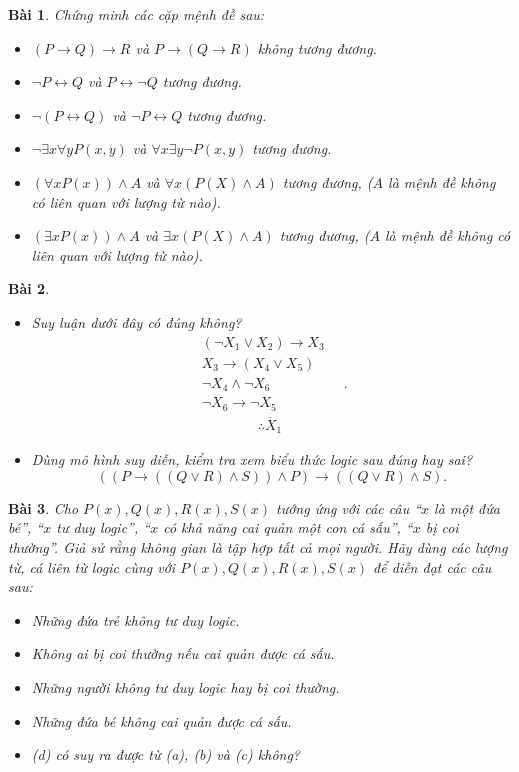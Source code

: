\documentclass[11pt, oneside,openright,a4paper]{book}
\newtheorem{bt}{Bài }[section]
\begin{document}
\begin{bt}
Chứng minh các cặp mệnh đề sau:
\begin{itemize}
\item[a)] $(P \rightarrow Q) \rightarrow R$ và $P \rightarrow (Q \rightarrow R)$ không tương đương.
    \item[b)] $\lnot P \leftrightarrow Q$ và $ P \leftrightarrow \lnot Q$ tương đương.
    \item[c)] $\lnot (P \leftrightarrow Q)$ và $ \lnot P \leftrightarrow Q$ tương đương.
    \item[d)] $\lnot \exists x \forall y P(x,y)$ và $\forall x \exists y \lnot P(x,y)$ tương đương.
    \item[e)] $(\forall x P(x)) \land A$ và $\forall x (P(X) \land A)$ tương đương, ($A$ là mệnh đề không có liên quan với lượng từ nào).
    \item[f)] $(\exists x P(x)) \land A$ và $\exists x (P(X) \land A)$ tương đương, ($A$ là mệnh đề không có liên quan với lượng từ nào).
\end{itemize}

\end{bt}
\begin{bt}
\begin{itemize}
\item[a)] Suy luận dưới đây có đúng không?
    $$\begin{matrix}
        (\lnot X_1 \lor X_2) \rightarrow X_3\\
        X_3 \rightarrow (X_4 \lor X_5)\\
        \lnot X_4 \land \lnot X_6\\
        \lnot X_6 \rightarrow \lnot X_5\\
        \overline{\qquad \qquad \therefore X_1 \qquad \qquad}
    \end{matrix}.$$
    \item[b)] Dùng mô hình suy diễn, kiểm tra xem biểu thức logic sau đúng hay sai?
    $$((P \rightarrow ((Q \lor R) \land S)) \land P) \rightarrow ((Q \lor R) \land S).$$
\end{itemize}
\end{bt}
\begin{bt}
Cho $P(x), Q(x), R(x), S(x)$ tướng ứng với các câu ``$x$ là một đứa bé'', ``$x$ tư duy logic'', ``$x$ có khả năng cai quản một con cá sấu'', ``$x$ bị coi thường''. Giả sử rằng không gian là tập hợp tất cả mọi người. Hãy dùng các lượng từ, cá liên từ logic cùng với $P(x), Q(x), R(x), S(x)$ để diễn đạt các câu sau:
\begin{itemize}
\item[a)] Những đứa trẻ không tư duy logic.
\item[b)] Không ai bị coi thường nếu cai quản được cá sấu.
\item[c)] Những người không tư duy logic hay bị coi thường.
\item[d)] Những đứa bé không cai quản được cá sấu.
\item[e)] (d) có suy ra được từ (a), (b) và (c) không?
\end{itemize}
    
\end{bt}
\end{document}
